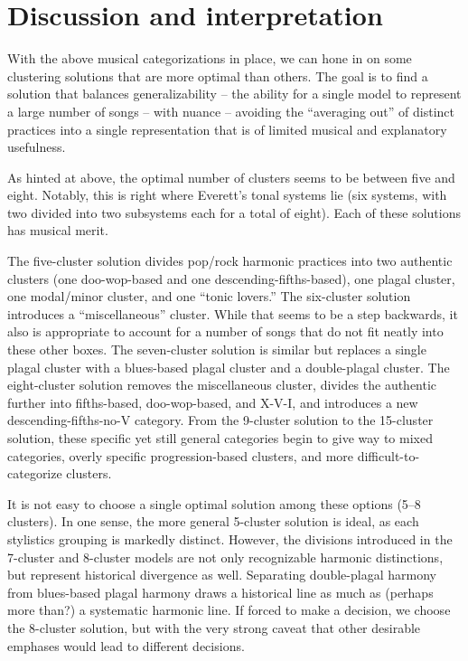 \chapter{Discussion and interpretation}
\label{discussionandinterpretation}

With the above musical categorizations in place, we can hone in on some clustering solutions that are more optimal than others. The goal is to find a solution that balances generalizability -- the ability for a single model to represent a large number of songs -- with nuance -- avoiding the ``averaging out'' of distinct practices into a single representation that is of limited musical and explanatory usefulness.

As hinted at above, the optimal number of clusters seems to be between five and eight. Notably, this is right where Everett's tonal systems lie (six systems, with two divided into two subsystems each for a total of eight). Each of these solutions has musical merit.

The five-cluster solution divides pop\slash rock harmonic practices into two authentic clusters (one doo-wop-based and one descending-fifths-based), one plagal cluster, one modal\slash minor cluster, and one ``tonic lovers.'' The six-cluster solution introduces a ``miscellaneous'' cluster. While that seems to be a step backwards, it also is appropriate to account for a number of songs that do not fit neatly into these other boxes. The seven-cluster solution is similar but replaces a single plagal cluster with a blues-based plagal cluster and a double-plagal cluster. The eight-cluster solution removes the miscellaneous cluster, divides the authentic further into fifths-based, doo-wop-based, and X-V-I, and introduces a new descending-fifths-no-V category. From the 9-cluster solution to the 15-cluster solution, these specific yet still general categories begin to give way to mixed categories, overly specific progression-based clusters, and more difficult-to-categorize clusters.

It is not easy to choose a single optimal solution among these options (5--8 clusters). In one sense, the more general 5-cluster solution is ideal, as each stylistics grouping is markedly distinct. However, the divisions introduced in the 7-cluster and 8-cluster models are not only recognizable harmonic distinctions, but represent historical divergence as well. Separating double-plagal harmony from blues-based plagal harmony draws a historical line as much as (perhaps more than?) a systematic harmonic line. If forced to make a decision, we choose the 8-cluster solution, but with the very strong caveat that other desirable emphases would lead to different decisions.

